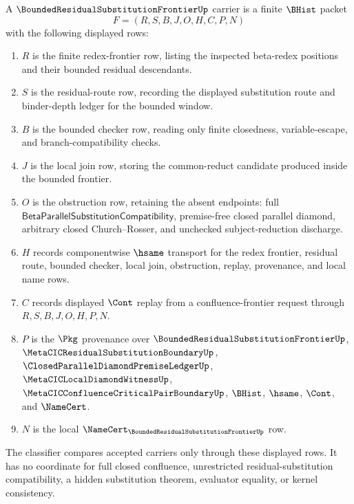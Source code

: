 \begin{definition}
\label{def:bounded-residual-substitution-frontier-carrier}
A $\BoundedResidualSubstitutionFrontierUp$ carrier is a finite $\BHist$ packet
$$
F=(R,S,B,J,O,H,C,P,N)
$$
with the following displayed rows:
\begin{enumerate}
\item $R$ is the finite redex-frontier row, listing the inspected beta-redex positions and their bounded residual descendants.
\item $S$ is the residual-route row, recording the displayed substitution route and binder-depth ledger for the bounded window.
\item $B$ is the bounded checker row, reading only finite closedness, variable-escape, and branch-compatibility checks.
\item $J$ is the local join row, storing the common-reduct candidate produced inside the bounded frontier.
\item $O$ is the obstruction row, retaining the absent endpoints: full $\mathsf{BetaParallelSubstitutionCompatibility}$, premise-free closed parallel diamond, arbitrary closed Church--Rosser, and unchecked subject-reduction discharge.
\item $H$ records componentwise $\hsame$ transport for the redex frontier, residual route, bounded checker, local join, obstruction, replay, provenance, and local name rows.
\item $C$ records displayed $\Cont$ replay from a confluence-frontier request through $R,S,B,J,O,H,P,N$.
\item $P$ is the $\Pkg$ provenance over $\BoundedResidualSubstitutionFrontierUp$, $\MetaCICResidualSubstitutionBoundaryUp$, $\ClosedParallelDiamondPremiseLedgerUp$, $\MetaCICLocalDiamondWitnessUp$, $\MetaCICConfluenceCriticalPairBoundaryUp$, $\BHist$, $\hsame$, $\Cont$, and $\NameCert$.
\item $N$ is the local $\NameCert_{\BoundedResidualSubstitutionFrontierUp}$ row.
\end{enumerate}
The classifier compares accepted carriers only through these displayed rows. It has no coordinate for full closed confluence, unrestricted residual-substitution compatibility, a hidden substitution theorem, evaluator equality, or kernel consistency.
\end{definition}

